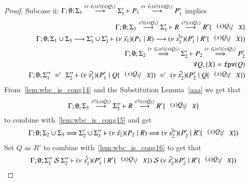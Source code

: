 \begin{proof}
	\noi Subcase ii: $\Gamma; \emptyset; \Sigma_1 \stackrel{(\nu\ \tilde{s_3}) s ! \langle (x)Q_1 \rangle}{\longrightarrow} \Sigma_1' \vdash P_1 \stackrel{(\nu\ \tilde{s_3}) s ! \langle (x)Q_1 \rangle}{\longrightarrow} P_1'$ implies
%
	\begin{eqnarray}
		& & \Gamma; \emptyset; \Sigma_3 \by{\bactinp{s}{\abs{x} {Q_1}}} \Sigma_3' \proves R \by{\bactinp{s}{\abs{x} {Q_1}}} R' \subst{\abs{x}{Q_1}}{X} \label{lem:wbc_is_cong14}\\
		& & \Gamma; \emptyset; \Sigma_1 \cup \Sigma_3 \by{} \Sigma_1' \cup \Sigma_3' \proves \newsp{\tilde{s_1}}{P_1 \Par R} \by{} \newsp{\tilde{s_1''}}{P_1' \Par R' \subst{\abs{x}{Q_1}}{X}}\\
		& & \Gamma; \emptyset; \Sigma_2\By{\news{\tilde{s_4}} \bactout{s}{\abs{x}{Q_2}}} \Sigma_2' \proves P_2 \By{\news{\tilde{s_4}} \bactout{s}{\abs{x}{Q_2}}} P_2' \label{lem:wbc_is_cong15}\\
		& & \forall Q, \set{X} = \fpv{Q} \\
		& & \Gamma; \emptyset; \Sigma_1''\ \wbc\ \Sigma_2'' \proves \newsp{\tilde{s_1'}}{P_1' \Par Q \subst{(x) Q_1}{X}}\ \wbc\ \newsp{\tilde{s_2'}}{P_2' \Par Q \subst{(x) Q_2}{X}} \label{lem:wbc_is_cong16}
	\end{eqnarray}
%
	From~\ref{lem:wbc_is_cong14} and the Substitution Lemma~\ref{aaa} we get that
	\[
		\Gamma; \emptyset; \Sigma_3 \by{\bactinp{s}{\abs{x} {Q_2}}} \Sigma_3'' \proves R \by{\bactinp{s}{\abs{x} {Q_2}}} R' \subst{\abs{x}{Q_2}}{X}
	\]
	\noi to combine with~\ref{lem:wbc_is_cong15} and get
	\[
		\Gamma; \emptyset; \Sigma_2 \cup \Sigma_3 \By{} \Sigma_2' \cup \Sigma_3'' \proves \newsp{\tilde{s_2}}{P_2 \Par R} \By{} \newsp{\tilde{s_2''}}{P_2' \Par R' \subst{\abs{x}{Q_2}}{X}}
	\]
%
	\noi Set $Q$ as $R'$ to combine with~\ref{lem:wbc_is_cong16} to get that
%
	\[
		\Gamma; \emptyset; \Sigma_1''\ \mathcal{S}\ \Sigma_2'' \proves \newsp{\tilde{s_1'}}{P_1' \Par R' \subst{\abs{x}{Q_1}}{X}}\ \mathcal{S}\ \newsp{\tilde{s_2'}}{P_2' \Par R' \subst{\abs{x}{Q_2}}{X}}
	\]


\end{proof}
